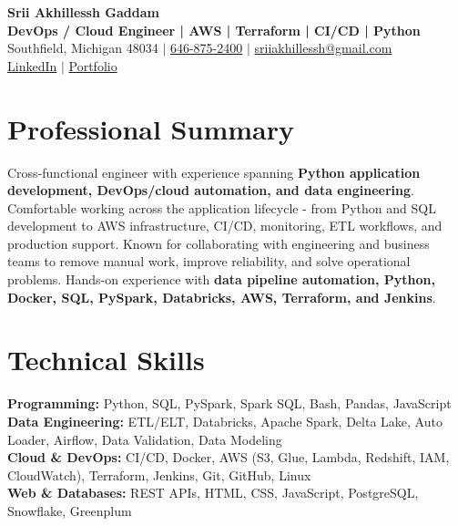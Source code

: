 \documentclass[letterpaper,10pt]{article}
\begin{document}
\fontsize{9.35pt}{10.45pt}\selectfont

\begin{center}
    {\LARGE \textbf{Srii Akhillessh Gaddam}} \\[-1pt]
    \textbf{DevOps / Cloud Engineer | AWS | Terraform | CI/CD | Python} \\[2pt]
    Southfield, Michigan 48034 $|$
    \href{tel:6468752400}{646-875-2400} $|$
    \href{mailto:sriiakhillessh@gmail.com}{sriiakhillessh@gmail.com} \\[1pt]
    \href{https://www.linkedin.com/in/srii-akhiilessh-gaddam-b48668191/}{LinkedIn} $|$
    \href{https://sriiakhillesshg.github.io/portfolio/}{Portfolio}
\end{center}
\vspace{-8pt}

\section{Professional Summary}
\small{Cross-functional engineer with experience spanning \textbf{Python application development, DevOps/cloud automation, and data engineering}. Comfortable working across the application lifecycle - from Python and SQL development to AWS infrastructure, CI/CD, monitoring, ETL workflows, and production support. Known for collaborating with engineering and business teams to remove manual work, improve reliability, and solve operational problems. Hands-on experience with \textbf{data pipeline automation, Python, Docker, SQL, PySpark, Databricks, AWS, Terraform, and Jenkins}.}

\section{Technical Skills}
\small{
\textbf{Programming:} Python, SQL, PySpark, Spark SQL, Bash, Pandas, JavaScript \\
\textbf{Data Engineering:} ETL/ELT, Databricks, Apache Spark, Delta Lake, Auto Loader, Airflow, Data Validation, Data Modeling \\
\textbf{Cloud \& DevOps:} CI/CD, Docker, AWS (S3, Glue, Lambda, Redshift, IAM, CloudWatch), Terraform, Jenkins, Git, GitHub, Linux \\
\textbf{Web \& Databases:} REST APIs, HTML, CSS, JavaScript, PostgreSQL, Snowflake, Greenplum
}
\end{document}
